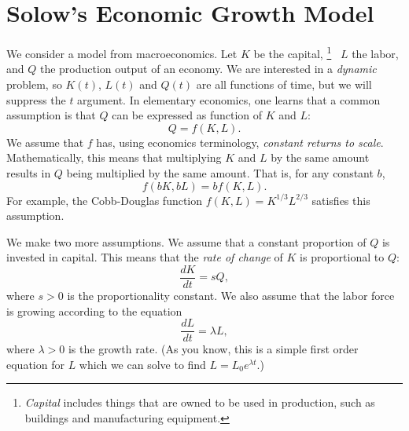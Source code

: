 \documentclass[reqno]{immbook}
\begin{document}
\section{Solow's Economic Growth Model}
We consider a model from macroeconomics.
Let $K$ be the capital,%
\footnote{\emph{Capital} includes things that are owned to be used
in production, such as buildings and manufacturing equipment.}%
~$L$ the labor, and $Q$ the production output of an economy.
We are interested in a \emph{dynamic} problem, so $K(t)$, $L(t)$ and
$Q(t)$ are all functions of time, but we will suppress the $t$ argument.
In elementary economics, one learns that a common assumption is that
$Q$ can be expressed as function of $K$ and $L$:
\begin{equation}
   Q = f(K,L).
   \label{EQN:PROD}
\end{equation}
We assume that $f$ has, using economics terminology,
\emph{constant returns to scale}.  Mathematically, this means
that multiplying $K$ and $L$ by the same amount results in $Q$ being
multiplied by the same amount.  That is, for any constant $b$,
\[
   f(bK,bL) = bf(K,L).
\]
For example, the Cobb-Douglas function
$f(K,L) = K^{1/3}L^{2/3}$
satisfies this assumption. 

We make two more assumptions.
We assume that a constant proportion of $Q$ is invested in capital.
This means that the \emph{rate of change} of $K$ is proportional to
$Q$:
\begin{equation}
    \frac{dK}{dt} = s Q,
\label{EQN:DKDT}
\end{equation}
where $s > 0$ is the proportionality constant.
We also assume that the labor force is growing according
to the equation
\begin{equation}
   \frac{dL}{dt} = \lambda L,
   \label{EQN:DLDT}
\end{equation}
where $\lambda > 0$ is the growth rate.  (As you know, this is a simple
first order equation for $L$ which we can solve to find 
$L = L_0 e^{\lambda t}$.)
\end{document}
